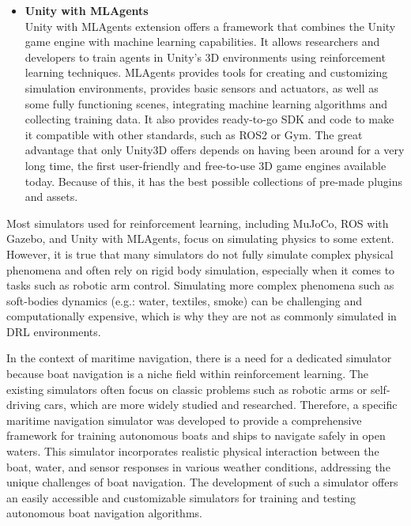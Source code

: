 \begin{itemize}
\item {\bf Unity with MLAgents}\\
Unity with MLAgents extension offers a framework that combines the Unity game engine with machine learning capabilities. It allows researchers and developers to train agents in Unity's 3D environments using reinforcement learning techniques. MLAgents provides tools for creating and customizing simulation environments, provides basic sensors and actuators, as well as some fully functioning scenes, integrating machine learning algorithms and collecting training data. It also provides ready-to-go SDK and code to make it compatible with other standards, such as ROS2 or Gym.
The great advantage that only Unity3D offers depends on having been around for a very long time, the first user-friendly and free-to-use 3D game engines available today. Because of this, it has the best possible collections of pre-made plugins and assets.\cite{unity3d}\cite{mlagents}

\end{itemize}

\begin{textblock}

Most simulators used for reinforcement learning, including MuJoCo, ROS with Gazebo, and Unity with MLAgents, focus on simulating physics to some extent. However, it is true that many simulators do not fully simulate complex physical phenomena and often rely on rigid body simulation, especially when it comes to tasks such as robotic arm control. Simulating more complex phenomena such as soft-bodies dynamics (e.g.: water, textiles, smoke) can be challenging and computationally expensive, which is why they are not as commonly simulated in DRL environments.

In the context of maritime navigation, there is a need for a dedicated simulator because boat navigation is a niche field within reinforcement learning. The existing simulators often focus on classic problems such as robotic arms or self-driving cars, which are more widely studied and researched. Therefore, a specific maritime navigation simulator was developed to provide a comprehensive framework for training autonomous boats and ships to navigate safely in open waters. This simulator incorporates realistic physical interaction between the boat, water, and sensor responses in various weather conditions, addressing the unique challenges of boat navigation. The development of such a simulator offers an easily accessible and customizable simulators for training and testing autonomous boat navigation algorithms.

\end{textblock}

